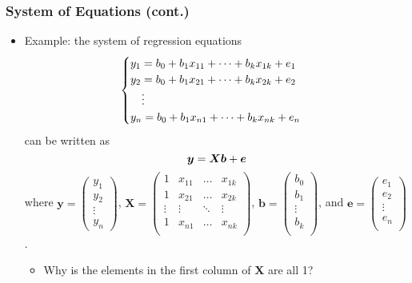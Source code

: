 \documentclass[pdflatex, 12pt]{beamer}
\begin{document}
\begin{frame}
\frametitle{System of Equations (cont.)}
\begin{itemize}
\item Example: the system of regression equations
 {\footnotesize
 \begin{eqnarray}
 \begin{cases}
 y_1 = b_0 + b_1 x_{11} + \cdots + b_k x_{1k} + e_1 & \\
 y_2 = b_0 + b_1 x_{21} + \cdots + b_k x_{2k} + e_2 & \\
 \ \ \ \vdots & \\
 y_n = b_0 + b_1 x_{n1} + \cdots + b_k x_{nk} + e_n & \notag
 \end{cases}
 \end{eqnarray}
 }
can be written as 
 \begin{equation}
 \bm{y} = \bm{Xb} + \bm{e} \notag
 \end{equation}
where {\scriptsize $\bm{y} = \begin{pmatrix}
y_1 \\
y_2 \\
\vdots \\
y_n
\end{pmatrix}$}, {\scriptsize $\bm{X} =
\begin{pmatrix}
 1 & x_{11} & \ldots & x_{1k} \\
 1 & x_{21} &  \ldots & x_{2k} \\
 \vdots & \vdots & \ddots & \vdots \\
 1 & x_{n1} &  \ldots & x_{nk} \\
\end{pmatrix}$}, {\scriptsize $\bm{b} = \begin{pmatrix}
b_0 \\
b_1 \\
\vdots \\
b_k \\
\end{pmatrix}$}, and  {\scriptsize $\bm{e} = \begin{pmatrix}
e_1 \\
e_2 \\
\vdots \\
e_n \\
\end{pmatrix}$}.
 \vspace{0.2cm}
 \begin{itemize}
 \item Why is the elements in the first column of $\bm{X}$ are all 1? 
 \end{itemize}
\end{itemize}
\end{frame}
\end{document}
